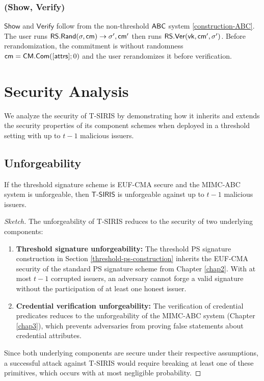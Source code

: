 \subsubsection*{(Show, Verify)}
$\mathsf{Show}$ and $\mathsf{Verify}$ follow from the non-threshold $\mathsf{ABC}$ system \ref{construction-ABC}. The user runs $\mathsf{RS.Rand}(\sigma, \mathsf{cm}) \to \sigma', \mathsf{cm}'$ then runs $\mathsf{RS.Ver}(\mathsf{vk}, \mathsf{cm}', \sigma')$. Before rerandomization, the commitment is without randomness $\mathsf{cm} = \mathsf{CM.Com}([\mathsf{attrs}]; 0)$ and the user rerandomizes it before verification.


\section{Security Analysis}
\label{sec:threshold-security}

We analyze the security of T-SIRIS by demonstrating how it inherits and extends the security properties of its component schemes when deployed in a threshold setting with up to $t-1$ malicious issuers.

\subsection{Unforgeability}

\begin{theorem}[Unforgeability]
If the threshold signature scheme is EUF-CMA secure and the MIMC-ABC system is unforgeable, then $\mathsf{T\text{-}SIRIS}$ is unforgeable against up to $t-1$ malicious issuers.
\end{theorem}

\begin{proof}[Sketch]
The unforgeability of T-SIRIS reduces to the security of two underlying components:

\begin{enumerate}
    \item \textbf{Threshold signature unforgeability:} The threshold PS signature construction in Section \ref{threshold-ps-construction} inherits the EUF-CMA security of the standard PS signature scheme from Chapter \ref{chap2}. With at most $t-1$ corrupted issuers, an adversary cannot forge a valid signature without the participation of at least one honest issuer.
    
    \item \textbf{Credential verification unforgeability:} The verification of credential predicates reduces to the unforgeability of the MIMC-ABC system (Chapter \ref{chap3}), which prevents adversaries from proving false statements about credential attributes.
\end{enumerate}

Since both underlying components are secure under their respective assumptions, a successful attack against T-SIRIS would require breaking at least one of these primitives, which occurs with at most negligible probability.
\end{proof}

